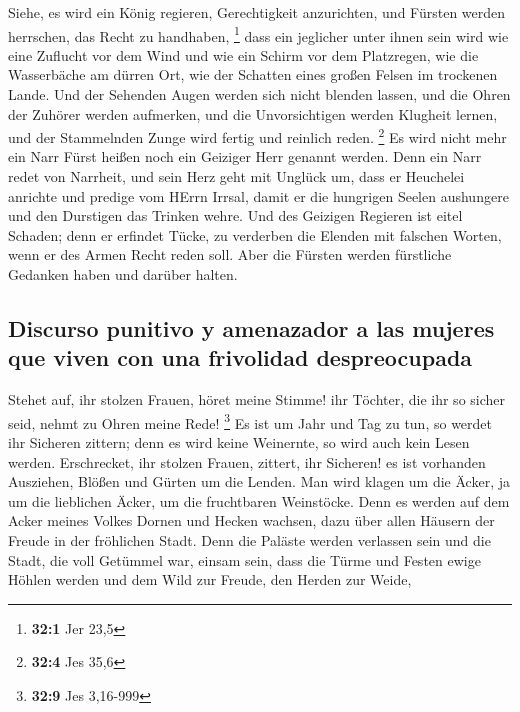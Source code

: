  Siehe, es wird ein König regieren, Gerechtigkeit
anzurichten, und Fürsten werden herrschen, das Recht zu handhaben,
\footnote{\textbf{32:1} Jer 23,5}  dass ein jeglicher
unter ihnen sein wird wie eine Zuflucht vor dem Wind und wie ein Schirm
vor dem Platzregen, wie die Wasserbäche am dürren Ort, wie der Schatten
eines großen Felsen im trockenen Lande.  Und der Sehenden
Augen werden sich nicht blenden lassen, und die Ohren der Zuhörer werden
aufmerken,  und die Unvorsichtigen werden Klugheit lernen,
und der Stammelnden Zunge wird fertig und reinlich reden. \footnote{\textbf{32:4}
  Jes 35,6}  Es wird nicht mehr ein Narr Fürst heißen noch
ein Geiziger Herr genannt werden.  Denn ein Narr redet von
Narrheit, und sein Herz geht mit Unglück um, dass er Heuchelei anrichte
und predige vom HErrn Irrsal, damit er die hungrigen Seelen aushungere
und den Durstigen das Trinken wehre.  Und des Geizigen
Regieren ist eitel Schaden; denn er erfindet Tücke, zu verderben die
Elenden mit falschen Worten, wenn er des Armen Recht reden soll.
 Aber die Fürsten werden fürstliche Gedanken haben und
darüber halten.

\hypertarget{discurso-punitivo-y-amenazador-a-las-mujeres-que-viven-con-una-frivolidad-despreocupada}{%
\subsection{Discurso punitivo y amenazador a las mujeres que viven con
una frivolidad
despreocupada}\label{discurso-punitivo-y-amenazador-a-las-mujeres-que-viven-con-una-frivolidad-despreocupada}}

 Stehet auf, ihr stolzen Frauen, höret meine Stimme! ihr
Töchter, die ihr so sicher seid, nehmt zu Ohren meine Rede! \footnote{\textbf{32:9}
  Jes 3,16-999}  Es ist um Jahr und Tag zu tun, so werdet
ihr Sicheren zittern; denn es wird keine Weinernte, so wird auch kein
Lesen werden.  Erschrecket, ihr stolzen Frauen, zittert,
ihr Sicheren! es ist vorhanden Ausziehen, Blößen und Gürten um die
Lenden.  Man wird klagen um die Äcker, ja um die
lieblichen Äcker, um die fruchtbaren Weinstöcke.  Denn es
werden auf dem Acker meines Volkes Dornen und Hecken wachsen, dazu über
allen Häusern der Freude in der fröhlichen Stadt.  Denn
die Paläste werden verlassen sein und die Stadt, die voll Getümmel war,
einsam sein, dass die Türme und Festen ewige Höhlen werden und dem Wild
zur Freude, den Herden zur Weide,

